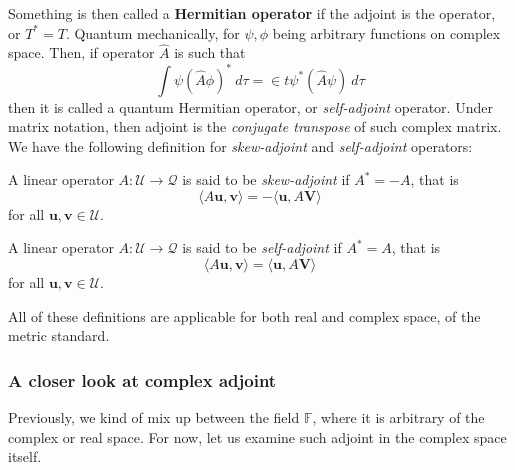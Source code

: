Something is then called a \textbf{Hermitian operator} if the adjoint is the operator, or $T^{*}=T$. Quantum mechanically, for $\psi, \phi$ being arbitrary functions on complex space. Then, if operator $\hat{A}$ is such that 
\begin{equation}
    \int \psi (\hat{A}\phi)^{*}\: d\tau = \in t \psi^{*}(\hat{A}\psi)\: d\tau
\end{equation}
then it is called a quantum Hermitian operator, or \textit{self-adjoint} operator. Under matrix notation, then adjoint is the \textit{conjugate transpose} of such complex matrix. We have the following definition for \textit{skew-adjoint} and \textit{self-adjoint} operators:
\begin{definition}
    A linear operator $A: \mathcal{U}\to\mathcal{Q}$ is said to be \textit{skew-adjoint} if $A^{*}=-A$, that is 
    \begin{equation}
        \langle A\mathbf{u}, \mathbf{v}\rangle = -\langle \mathbf{u} , A\mathbf{V}\rangle
    \end{equation}
    for all $\mathbf{u,v}\in \mathcal{U}$. 
\end{definition}
\begin{definition}
    A linear operator $A: \mathcal{U}\to\mathcal{Q}$ is said to be \textit{self-adjoint} if $A^{*}=A$, that is 
    \begin{equation}
        \langle A\mathbf{u}, \mathbf{v}\rangle = \langle \mathbf{u} , A\mathbf{V}\rangle
    \end{equation}
    for all $\mathbf{u,v}\in \mathcal{U}$. 
\end{definition}
All of these definitions are applicable for both real and complex space, of the metric standard. 
\subsubsection{A closer look at complex adjoint}

Previously, we kind of mix up between the field $\mathbb{F}$, where it is arbitrary of the complex or real space. For now, let us examine such adjoint in the complex space itself. 

